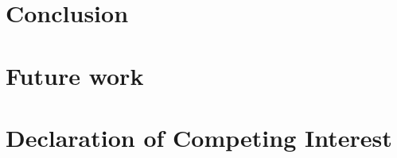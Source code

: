 \section{Conclusion} \label{Conclusion}

\section{Future work}
\section{Declaration of Competing Interest}
